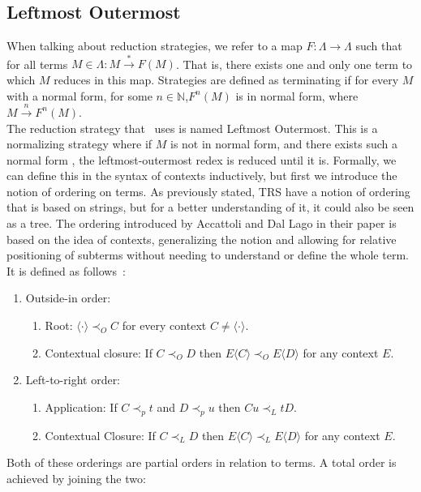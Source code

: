 \documentclass[11pt]{article}
\begin{document}
\subsection{Leftmost Outermost}
When talking about reduction strategies, we refer to a map $F : \Lambda \rightarrow \Lambda$ such that for all terms $M \in \Lambda : M \xrightarrow{*} F(M)$. That is, there exists one and only one term to which $M$ reduces in this map. Strategies are defined as terminating if for every $M$ with a normal form, for some $n \in \mathbb{N}$,$ F^{n} (M)$ is in normal form, where $M \xrightarrow{n} F^n(M)$. \\
The reduction strategy that~\cite{beta-invariance} uses is named Leftmost Outermost. This is a normalizing strategy where if $M$ is not in normal form, and there exists such a normal form , the leftmost-outermost redex is reduced until it is. Formally, we can define this in the syntax of contexts inductively, but first we introduce the notion of ordering on terms. As previously stated, TRS have a notion of ordering that is based on strings, but for a better understanding of it, it could also be seen as a tree. The ordering introduced by Accattoli and Dal Lago in their paper is based on the idea of contexts, generalizing the notion and allowing for relative positioning of subterms without needing to understand or define the whole term. It is defined as follows~\cite{beta-invariance}:
\begin{enumerate}
  \item Outside-in order:
        \begin{enumerate}
          \item Root: $\langle \cdot \rangle \prec_{O} C$ for every context $C \neq \langle \cdot \rangle$.
          \item Contextual closure: If $C \prec_{O} D$ then $E\langle C \rangle \prec_{O} E\langle D \rangle $ for any context $E$.
        \end{enumerate}
  \item Left-to-right order:
        \begin{enumerate}
          \item Application: If $C \prec_{p} t$ and $D \prec_{p} u$ then $Cu \prec_{L} tD$.
          \item Contextual Closure: If $C \prec_{L} D$ then  $E\langle C \rangle \prec_{L} E\langle D\rangle$ for any context $E$.
        \end{enumerate}
\end{enumerate}
Both of these orderings are partial orders in relation to terms. A total order is achieved by joining the two:
\end{document}
